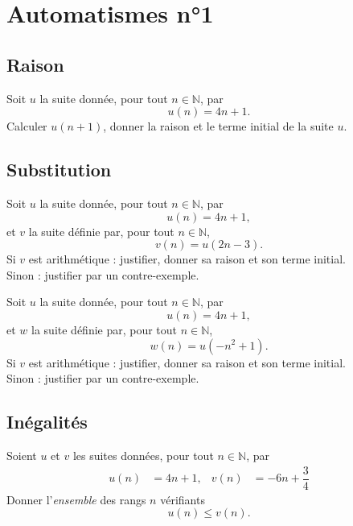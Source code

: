 \documentclass[14pt]{beamer}
\newcommand{\N}{\mathbb{N}}
\begin{document}
\section{Automatismes n°1}

\subsection{Raison}

\begin{frame}
	
	Soit $u$ la suite donnée, pour tout $n\in\N$, par
		\[ u(n) = 4n+1. \]
	Calculer $u(n+1)$, donner la raison et le terme initial de la suite $u$.

\end{frame}

\subsection{Substitution}

\begin{frame}

	Soit $u$ la suite donnée, pour tout $n\in\N$, par
		\[ u(n) = 4n+1, \]
	et $v$ la suite définie par, pour tout $n\in\N$, 
		\[ v(n) = u(2n-3). \]
	Si $v$ est arithmétique : justifier, donner sa raison et son terme initial.\\
	Sinon : justifier par un contre-exemple.
\end{frame}

\begin{frame}

	Soit $u$ la suite donnée, pour tout $n\in\N$, par
		\[ u(n) = 4n+1, \]
	et $w$ la suite définie par, pour tout $n\in\N$, 
		\[ w(n) = u(-n^2+1). \]
	Si $v$ est arithmétique : justifier, donner sa raison et son terme initial.\\
	Sinon : justifier par un contre-exemple.

\end{frame}

\subsection{Inégalités}

\begin{frame}

	Soient $u$ et $v$ les suites données, pour tout $n\in\N$, par
		\begin{align*}
			u(n) &= 4n+1, & v(n) &= -6n+\dfrac34
		\end{align*}
	Donner l'\emph{ensemble} des rangs $n$ vérifiants
		\[ u(n) \leq v(n). \]
\end{frame}
\end{document}
